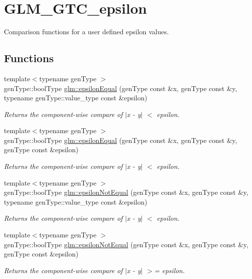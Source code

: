 \hypertarget{group__gtc__epsilon}{\section{G\-L\-M\-\_\-\-G\-T\-C\-\_\-epsilon}
\label{group__gtc__epsilon}
}


Comparison functions for a user defined epsilon values.  


\subsection*{Functions}
\begin{DoxyCompactItemize}
\item 
{\footnotesize template$<$typename gen\-Type $>$ }\\gen\-Type\-::bool\-Type \hyperlink{group__gtc__epsilon_gaad4e444823c0751ab1a90993d37be4c2}{glm\-::epsilon\-Equal} (gen\-Type const \&x, gen\-Type const \&y, typename gen\-Type\-::value\-\_\-type const \&epsilon)
\begin{DoxyCompactList}\small\item\em Returns the component-\/wise compare of $\vert$x -\/ y$\vert$ $<$ epsilon. \end{DoxyCompactList}\item 
{\footnotesize template$<$typename gen\-Type $>$ }\\gen\-Type\-::bool\-Type \hyperlink{group__gtc__epsilon_gaec6b443164caf0c13f8539d135619b6d}{glm\-::epsilon\-Equal} (gen\-Type const \&x, gen\-Type const \&y, gen\-Type const \&epsilon)
\begin{DoxyCompactList}\small\item\em Returns the component-\/wise compare of $\vert$x -\/ y$\vert$ $<$ epsilon. \end{DoxyCompactList}\item 
{\footnotesize template$<$typename gen\-Type $>$ }\\gen\-Type\-::bool\-Type \hyperlink{group__gtc__epsilon_ga71753a95d99c01418eb74ef87638aa2f}{glm\-::epsilon\-Not\-Equal} (gen\-Type const \&x, gen\-Type const \&y, typename gen\-Type\-::value\-\_\-type const \&epsilon)
\begin{DoxyCompactList}\small\item\em Returns the component-\/wise compare of $\vert$x -\/ y$\vert$ $<$ epsilon. \end{DoxyCompactList}\item 
{\footnotesize template$<$typename gen\-Type $>$ }\\gen\-Type\-::bool\-Type \hyperlink{group__gtc__epsilon_gab5f646ca785d3d521d68115468be754b}{glm\-::epsilon\-Not\-Equal} (gen\-Type const \&x, gen\-Type const \&y, gen\-Type const \&epsilon)
\begin{DoxyCompactList}\small\item\em Returns the component-\/wise compare of $\vert$x -\/ y$\vert$ $>$= epsilon. \end{DoxyCompactList}\end{DoxyCompactItemize}


